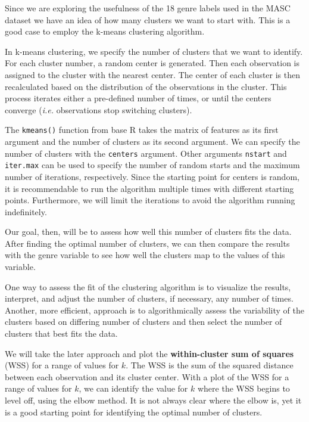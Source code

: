 \documentclass[
  letterpaper,
  krantz1]{latex/krantz-mod}
\theoremstyle{definition}
\theoremstyle{definition}
\theoremstyle{remark}
\begin{document}
\pagebreak

Since we are exploring the usefulness of the 18 genre labels used in the
MASC dataset we have an idea of how many clusters we want to start with.
This is a good case to employ the k-means clustering algorithm.

In k-means clustering, we specify the number of clusters that we want to
identify. For each cluster number, a random center is generated. Then
each observation is assigned to the cluster with the nearest center. The
center of each cluster is then recalculated based on the distribution of
the observations in the cluster. This process iterates either a
pre-defined number of times, or until the centers converge (\emph{i.e.}
observations stop switching clusters).

The \texttt{kmeans()} function from base R takes the matrix of features
as its first argument and the number of clusters as its second argument.
We can specify the number of clusters with the \texttt{centers}
argument. Other arguments \texttt{nstart} and \texttt{iter.max} can be
used to specify the number of random starts and the maximum number of
iterations, respectively. Since the starting point for centers is
random, it is recommendable to run the algorithm multiple times with
different starting points. Furthermore, we will limit the iterations to
avoid the algorithm running indefinitely.

Our goal, then, will be to assess how well this number of clusters fits
the data. After finding the optimal number of clusters, we can then
compare the results with the genre variable to see how well the clusters
map to the values of this variable.

One way to assess the fit of the clustering algorithm is to visualize
the results, interpret, and adjust the number of clusters, if necessary,
any number of times. Another, more efficient, approach is to
algorithmically assess the variability of the clusters based on
differing number of clusters and then select the number of clusters that
best fits the data.

We will take the later approach and plot the \textbf{within-cluster sum
of squares} (WSS) for a range of values for \(k\). The WSS is the sum of
the squared distance between each observation and its cluster center.
With a plot of the WSS for a range of values for \(k\), we can identify
the value for \(k\) where the WSS begins to level off, using the elbow
method. It is not always clear where the elbow is, yet it is a good
starting point for identifying the optimal number of clusters.
\end{document}
